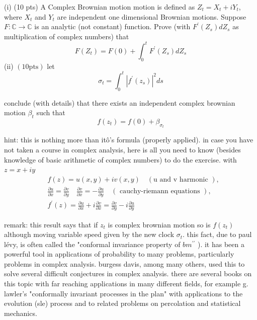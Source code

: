 \begin{problem}
	(i) (10 pts) A Complex Brownian motion motion is defined as $Z_t=X_t+i Y_t$, where $X_t$ and $Y_t$ are independent one dimensional Brownian motions. Suppose $F: \mathbb{C} \rightarrow \mathbb{C}$ is an analytic (not constant) function. Prove (with $F^{\prime}\left(Z_s\right) d Z_s$ as multiplication of complex numbers) that
\[
F\left(Z_t\right)=F(0)+\int_0^t F^{\prime}\left(Z_s\right) d Z_s
\]
(ii) $(10 \mathrm{pts})$ let
\[
\sigma_t=\int_0^t\left|f^{\prime}\left(z_s\right)\right|^2 d s
\]

conclude (with details) that there exists an independent complex brownian motion $\beta_t$ such that
\[
f\left(z_t\right)=f(0)+\beta_{\sigma_t}
\]

hint: this is nothing more than itô's formula (properly applied). in case you have not taken a course in complex analysis, here is all you need to know (besides knowledge of basic arithmetic of complex numbers) to do the exercise. with $z=x+i y$
\[
\begin{aligned}
& f(z)=u(x, y)+i v(x, y) \quad(\mathrm{u} \text { and } \mathrm{v} \text { harmonic }), \\
& \frac{\partial u}{\partial x}=\frac{\partial v}{\partial y} \quad \frac{\partial v}{\partial x}=-\frac{\partial u}{\partial y} \quad(\text { cauchy-riemann equations }), \\
& f^{\prime}(z)=\frac{\partial u}{\partial x}+i \frac{\partial v}{\partial x}=\frac{\partial v}{\partial y}-i \frac{\partial u}{\partial y}
\end{aligned}
\]

remark: this result says that if $z_t$ is complex brownian motion so is $f\left(z_t\right)$ although moving variable speed given by the new clock $\sigma_t$. this fact, due to paul lévy, is often called the "conformal invariance property of $b m^{\prime \prime}$ ). it has been a powerful tool in applications of probability to many problems, particularly problems in complex analysis. burgess davis, among many others, used this to solve several difficult conjectures in complex analysis. there are several books on this topic with far reaching applications in many different fields, for example g. lawler's "conformally invariant processes in the plan" with applications to the evolution (sle) process and to related problems on percolation and statistical mechanics.
	
\end{problem}

